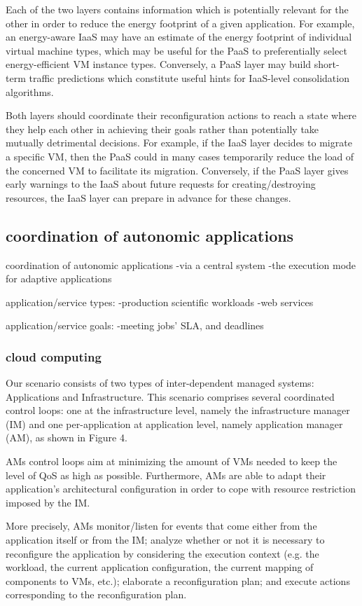 Each of the two layers contains information which is potentially relevant for the other in order to reduce the energy footprint of a given application. For example, an energy-aware IaaS may have an estimate of the energy footprint of individual virtual machine types, which may be useful for the PaaS to preferentially select energy-efficient VM instance types. Conversely, a PaaS layer may build short-term traffic predictions which constitute useful hints for IaaS-level consolidation algorithms.

Both layers should coordinate their reconfiguration actions to reach a state where they help each other in achieving their goals rather than potentially take mutually detrimental decisions. For example, if the IaaS layer decides to migrate a specific VM, then the PaaS could in many cases temporarily reduce the load of the concerned VM to facilitate its migration. Conversely, if the PaaS layer gives early warnings to the IaaS about future
requests for creating/destroying resources, the IaaS layer can prepare in advance for these changes. 

\subsection{coordination of autonomic applications}
coordination of autonomic applications
-via a central system
-the execution mode for adaptive applications

application/service types:
-production scientific workloads
-web services

application/service goals:
-meeting jobs' SLA, and deadlines


\subsubsection{cloud computing}
Our scenario consists of two types of inter-dependent managed systems: Applications and Infrastructure.
This scenario comprises several coordinated control loops: one at the infrastructure level, namely the infrastructure manager (IM) and one per-application at application level, namely application manager (AM), as shown in Figure 4.

AMs control loops aim at minimizing the amount of VMs needed to keep the level of QoS as high as possible. Furthermore, AMs are able to adapt their application’s architectural configuration in order to cope with resource restriction imposed by the IM.

More precisely, AMs monitor/listen for events that come either from the application itself or from the IM; analyze whether or not it is necessary to reconfigure the application by considering the execution context (e.g. the workload, the current application configuration, the current mapping of components to VMs, etc.); elaborate a reconfiguration plan; and execute actions corresponding to the reconfiguration plan.

